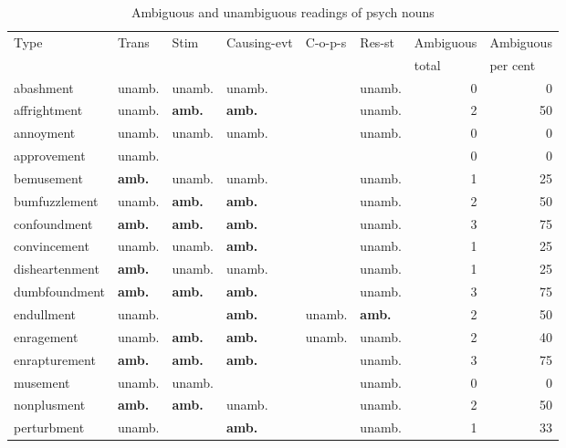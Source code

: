 \begin{sidewaystable}[ph!]
\caption[Ambiguous and unambiguous readings of psych nouns]{Ambiguous and unambiguous readings of psych nouns} 
\label{tab:AmbiguityPsych}
\begin{small}
\begin{tabular}{llllllrr}
\lsptoprule
Type              & Trans   & Stim    & Causing-evt & C-o-p-s & Res-st & \multicolumn{1}{l}{Ambiguous} & \multicolumn{1}{l}{Ambiguous}\\
&&&&&&\multicolumn{1}{l}{total}& \multicolumn{1}{l}{per cent}\\
\midrule
 abashment      & unamb. & unamb. & unamb. &        & unamb. & 0 & 0  \\
affrightment   & unamb. & \textbf{amb.}   & \textbf{amb.}   &        & unamb. & 2 & 50 \\
 annoyment      & unamb. & unamb. & unamb. &        & unamb. & 0 & 0  \\
approvement    & unamb. &        &        &        &        & 0 & 0  \\
 bemusement     & \textbf{amb.}   & unamb. & unamb. &        & unamb. & 1 & 25 \\
bumfuzzlement  & unamb. & \textbf{amb.}   & \textbf{amb.}   &        & unamb. & 2 & 50 \\
 confoundment   & \textbf{amb.}   & \textbf{amb.}   & \textbf{amb.}   &        & unamb. & 3 & 75 \\
convincement   & unamb. & unamb. & \textbf{amb.}   &        & unamb. & 1 & 25 \\
 disheartenment & \textbf{amb.}   & unamb. & unamb. &        & unamb. & 1 & 25 \\
dumbfoundment  & \textbf{amb.}   & \textbf{amb.}   & \textbf{amb.}   &        & unamb. & 3 & 75 \\
 endullment     & unamb. &        & \textbf{amb.}   & unamb. & \textbf{amb.}   & 2 & 50 \\
enragement     & unamb. & \textbf{amb.}   & \textbf{amb.}   & unamb. & unamb. & 2 & 40 \\
 enrapturement  & \textbf{amb.}   & \textbf{amb.}   & \textbf{amb.}   &        & unamb. & 3 & 75 \\
musement       & unamb. & unamb. &        &        & unamb. & 0 & 0  \\
 nonplusment    & \textbf{amb.}   & \textbf{amb.}   & unamb.   &        & unamb. & 2 & 50 \\
perturbment    & unamb. &        & \textbf{amb.}   &        & unamb. & 1 & 33 \\

\end{tabular}
\end{small}
\end{sidewaystable}
